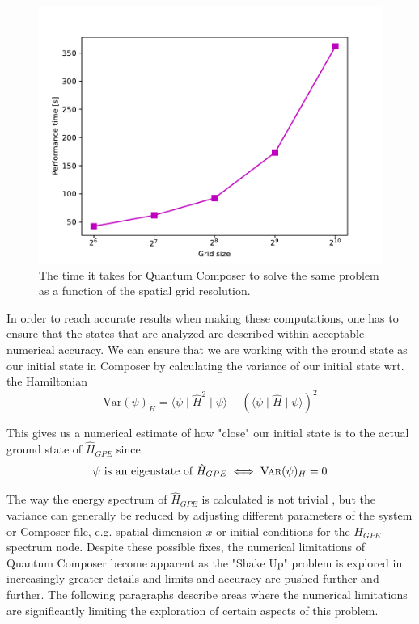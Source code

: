 \documentclass[aps,pra,reprint,superscriptaddress]{revtex4-1}
\begin{document}
\begin{figure}
	\includegraphics[width=\columnwidth]{graphics/PerformanceTime.pdf}
	\caption{The time it takes for Quantum Composer to solve the same problem as a function of the spatial grid resolution.}
	\label{fig:performanceTime}
\end{figure}


In order to reach accurate results when making these computations, one has to ensure that the states that are analyzed are described within acceptable numerical accuracy. We can ensure that we are working with the ground state as our initial state in Composer by calculating the variance of our initial state wrt. the Hamiltonian
\begin{equation}
	\text{Var}(\psi)_H = \langle \psi \mid \hat{H}^2 \mid \psi \rangle - (\langle \psi \mid \hat{H} \mid \psi \rangle)^2
\end{equation}

This gives us a numerical estimate of how "close" our initial state is to the actual ground state of $\hat{H}_{GPE}$ since
\begin{equation}
	\psi \text{ is an eigenstate of } \hat{H}_{GPE} \iff \textsc{Var}(\psi)_H = 0
\end{equation}

The way the energy spectrum of $\hat{H}_{GPE}$ is calculated is not trivial \cite{QEngine}, but the variance can generally be reduced by adjusting different parameters of the system or Composer file, e.g. spatial dimension $x$ or initial conditions for the $H_{GPE}$ spectrum node. Despite these possible fixes, the numerical limitations of Quantum Composer become apparent as the "Shake Up" problem is explored in increasingly greater details and limits and accuracy are pushed further and further. The following paragraphs describe areas where the numerical limitations are significantly limiting the exploration of certain aspects of this problem.\\
\end{document}
